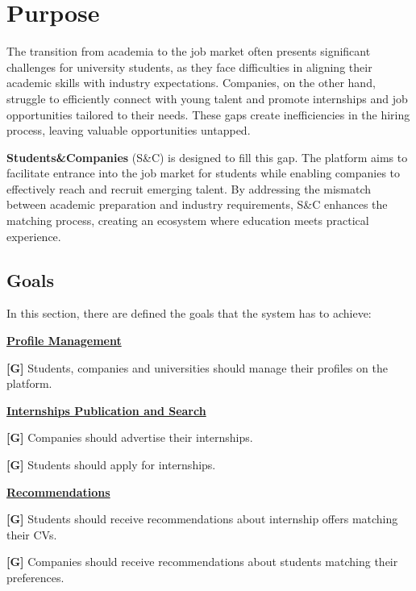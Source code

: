 \section{Purpose}
The transition from academia to the job market often presents significant challenges for university students, as they face difficulties in aligning their academic skills with industry expectations. Companies, on the other hand, struggle to efficiently connect with young talent and promote internships and job opportunities tailored to their needs. These gaps create inefficiencies in the hiring process, leaving valuable opportunities untapped.

\textbf{Students\&Companies} (S\&C) is designed to fill this gap. The platform aims to facilitate entrance into the job market for students while enabling companies to effectively reach and recruit emerging talent. By addressing the mismatch between academic preparation and industry requirements, S\&C enhances the matching process, creating an ecosystem where education meets practical experience.
\label{sec:purpose}%

\subsection{Goals}
\label{subsec:goals}%
\setcounter{g}{1}
\newcommand{\cg}{\theg\stepcounter{g}}

\setcounter{subg}{1}
\newcommand{\csubg}{\thesubg\stepcounter{subg}}
\newcommand{\resetsubg}{\setcounter{subg}{1}}


In this section, there are defined the goals that the system has to achieve:

    \uline{\textbf{Profile Management}}

        \textbf{[G\cg]} Students, companies and universities should manage their profiles on the platform.

    \uline{\textbf{Internships Publication and Search}}
        
        \textbf{[G\cg]} Companies should advertise their internships.

        \textbf{[G\cg]} Students should apply for internships.

    \uline{\textbf{Recommendations}}
            
        \textbf{[G\cg]} Students should receive recommendations about internship offers matching their CVs.

        \textbf{[G\cg]} Companies should receive recommendations about students matching their preferences.

